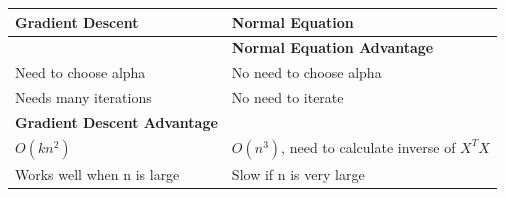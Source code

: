 \documentclass[
]{book}
\begin{document}
\begin{longtable}[]{@{}ll@{}}
\toprule
\begin{minipage}[b]{0.38\columnwidth}\raggedright
Gradient Descent\strut
\end{minipage} & \begin{minipage}[b]{0.56\columnwidth}\raggedright
Normal Equation\strut
\end{minipage}\tabularnewline
\midrule
\endhead
\begin{minipage}[t]{0.38\columnwidth}\raggedright
\strut
\end{minipage} & \begin{minipage}[t]{0.56\columnwidth}\raggedright
\textbf{Normal Equation Advantage}\strut
\end{minipage}\tabularnewline
\begin{minipage}[t]{0.38\columnwidth}\raggedright
Need to choose alpha\strut
\end{minipage} & \begin{minipage}[t]{0.56\columnwidth}\raggedright
No need to choose alpha\strut
\end{minipage}\tabularnewline
\begin{minipage}[t]{0.38\columnwidth}\raggedright
Needs many iterations\strut
\end{minipage} & \begin{minipage}[t]{0.56\columnwidth}\raggedright
No need to iterate\strut
\end{minipage}\tabularnewline
\begin{minipage}[t]{0.38\columnwidth}\raggedright
\textbf{Gradient Descent Advantage}\strut
\end{minipage} & \begin{minipage}[t]{0.56\columnwidth}\raggedright
\strut
\end{minipage}\tabularnewline
\begin{minipage}[t]{0.38\columnwidth}\raggedright
\(O(kn^2)\)\strut
\end{minipage} & \begin{minipage}[t]{0.56\columnwidth}\raggedright
\(O(n^3)\), need to calculate inverse of \(X^TX\)\strut
\end{minipage}\tabularnewline
\begin{minipage}[t]{0.38\columnwidth}\raggedright
Works well when n is large\strut
\end{minipage} & \begin{minipage}[t]{0.56\columnwidth}\raggedright
Slow if n is very large\strut
\end{minipage}\tabularnewline
\bottomrule
\end{longtable}
\end{document}
